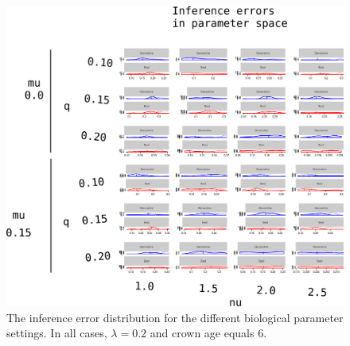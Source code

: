 \begin{figure}[!htbp]
  \includegraphics[width=\textwidth]{razzo-figures/20190620_figure_1_annotated.png}
  \caption{
    The inference error distribution 
    for the different biological
    parameter settings. In all cases, $\lambda = 0.2$ and 
    crown age equals 6. 
  }
  \label{fig:results}
\end{figure}
